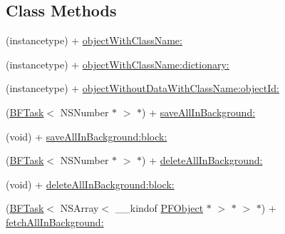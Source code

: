 \subsection*{Class Methods}
\begin{DoxyCompactItemize}
\item 
(instancetype) + \hyperlink{interface_p_f_object_a4efd97521f641676eb91165c0c0d2365}{object\+With\+Class\+Name\+:}
\item 
(instancetype) + \hyperlink{interface_p_f_object_aead270239124136ac793de1e31f86186}{object\+With\+Class\+Name\+:dictionary\+:}
\item 
(instancetype) + \hyperlink{interface_p_f_object_a0459cffea34df2b733ac5550ae858d95}{object\+Without\+Data\+With\+Class\+Name\+:object\+Id\+:}
\item 
(\hyperlink{class_b_f_task}{B\+F\+Task}$<$ N\+S\+Number $\ast$ $>$ $\ast$) + \hyperlink{interface_p_f_object_a3b27ba628ecb5585482b28a203b1c546}{save\+All\+In\+Background\+:}
\begin{DoxyCompactList}\small\item\em 

 \end{DoxyCompactList}\item 
(void) + \hyperlink{interface_p_f_object_a9f8e1c9599b8149f767554947148d856}{save\+All\+In\+Background\+:block\+:}
\item 
(\hyperlink{class_b_f_task}{B\+F\+Task}$<$ N\+S\+Number $\ast$ $>$ $\ast$) + \hyperlink{interface_p_f_object_a41fd3a981e932b79bf3d9aee39fdb787}{delete\+All\+In\+Background\+:}
\begin{DoxyCompactList}\small\item\em 

 \end{DoxyCompactList}\item 
(void) + \hyperlink{interface_p_f_object_aaa8bdd1516a5d92045aca3171b2762ee}{delete\+All\+In\+Background\+:block\+:}
\item 
(\hyperlink{class_b_f_task}{B\+F\+Task}$<$ N\+S\+Array$<$ \+\_\+\+\_\+kindof \hyperlink{interface_p_f_object}{P\+F\+Object} $\ast$ $>$ $\ast$ $>$ $\ast$) + \hyperlink{interface_p_f_object_a82c43e140a1e65eb7d88d3f7aea5075f}{fetch\+All\+In\+Background\+:}
\begin{DoxyCompactList}\small\item\em 


\end{DoxyCompactList}
\end{DoxyCompactItemize}
